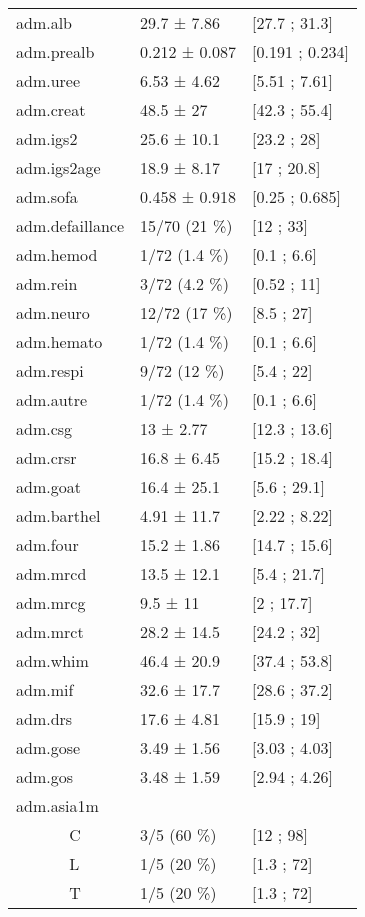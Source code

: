 \documentclass[]{article}
\begin{document}
\begin{longtable}{lll}
  adm.alb & 29.7 ± 7.86 & [27.7 ; 31.3] \\ 
  adm.prealb & 0.212 ± 0.087 & [0.191 ; 0.234] \\ 
  adm.uree & 6.53 ± 4.62 & [5.51 ; 7.61] \\ 
  adm.creat & 48.5 ± 27 & [42.3 ; 55.4] \\ 
  adm.igs2 & 25.6 ± 10.1 & [23.2 ; 28] \\ 
  adm.igs2age & 18.9 ± 8.17 & [17 ; 20.8] \\ 
  adm.sofa & 0.458 ± 0.918 & [0.25 ; 0.685] \\ 
  adm.defaillance & 15/70 (21 \%) &  [12 ; 33] \\ 
  adm.hemod & 1/72 (1.4 \%) &  [0.1 ; 6.6] \\ 
  adm.rein & 3/72 (4.2 \%) &  [0.52 ; 11] \\ 
  adm.neuro & 12/72 (17 \%) &  [8.5 ; 27] \\ 
  adm.hemato & 1/72 (1.4 \%) &  [0.1 ; 6.6] \\ 
  adm.respi & 9/72 (12 \%) &  [5.4 ; 22] \\ 
  adm.autre & 1/72 (1.4 \%) &  [0.1 ; 6.6] \\ 
  adm.csg & 13 ± 2.77 & [12.3 ; 13.6] \\ 
  adm.crsr & 16.8 ± 6.45 & [15.2 ; 18.4] \\ 
  adm.goat & 16.4 ± 25.1 & [5.6 ; 29.1] \\ 
  adm.barthel & 4.91 ± 11.7 & [2.22 ; 8.22] \\ 
  adm.four & 15.2 ± 1.86 & [14.7 ; 15.6] \\ 
  adm.mrcd & 13.5 ± 12.1 & [5.4 ; 21.7] \\ 
  adm.mrcg & 9.5 ± 11 & [2 ; 17.7] \\ 
  adm.mrct & 28.2 ± 14.5 & [24.2 ; 32] \\ 
  adm.whim & 46.4 ± 20.9 & [37.4 ; 53.8] \\ 
  adm.mif & 32.6 ± 17.7 & [28.6 ; 37.2] \\ 
  adm.drs & 17.6 ± 4.81 & [15.9 ; 19] \\ 
  adm.gose & 3.49 ± 1.56 & [3.03 ; 4.03] \\ 
  adm.gos & 3.48 ± 1.59 & [2.94 ; 4.26] \\ 
  adm.asia1m &   &   \\ 
  ~~~~~~ C & 3/5 (60 \%) &  [12 ; 98] \\ 
  ~~~~~~ L & 1/5 (20 \%) &  [1.3 ; 72] \\ 
  ~~~~~~ T & 1/5 (20 \%) &  [1.3 ; 72] \\ 

\end{longtable}
\end{document}
